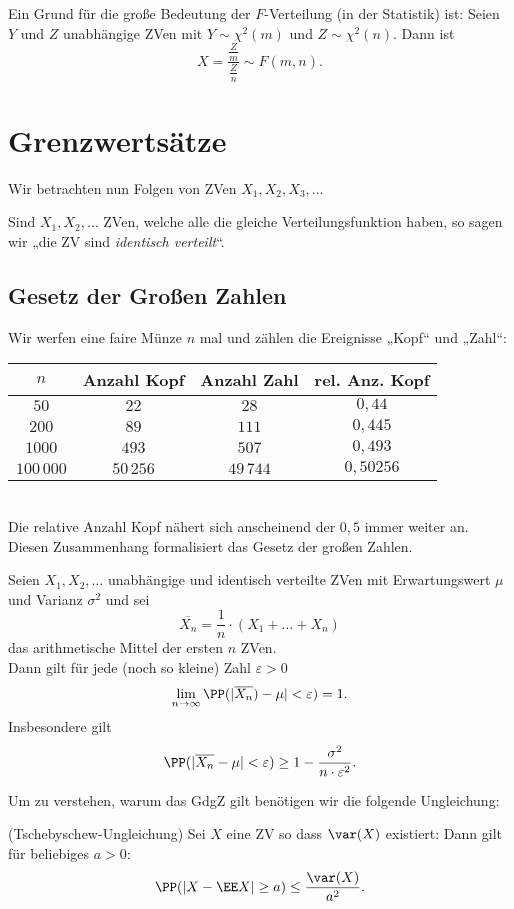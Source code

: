 Ein Grund für die große Bedeutung der $ F $-Verteilung (in der Statistik) ist:
 Seien $ Y $ und $ Z $ unabhängige ZVen mit $ Y\sim \chi^{2} (m) $ und $ Z \sim \chi^{2}(n) $. Dann ist 
\[ X=\frac{\frac{Z}{m}}{\frac{Z}{n}}\sim F(m,n) \text{.} \]
\section{Grenzwertsätze}

Wir betrachten nun Folgen von ZVen $X_1, X_2, X_3, \ldots$

 Sind $X_1, X_2, \ldots$ ZVen, welche alle die gleiche Verteilungsfunktion haben, so sagen wir „die ZV sind \emph{identisch verteilt}“.

\subsection{Gesetz der Großen Zahlen}
 Wir werfen eine faire Münze $n$ mal und zählen die Ereignisse „Kopf“ und „Zahl“:\\
\begin{tabular}{c | c | c | c}
	$n$ & Anzahl Kopf & Anzahl Zahl & rel. Anz. Kopf\\\hline
	$50$ & $22$ & $28$ & $0,44$\\
	$200$& $89$& $111$ & $0,445$\\
	$1000$ & $493$& $507$& $0,493$\\
	$100\,000$& $50\,256$&$49\,744$& $0,50256$
\end{tabular}\\
Die relative Anzahl Kopf nähert sich anscheinend der $0,5$ immer weiter an.\\
Diesen Zusammenhang formalisiert das Gesetz der großen Zahlen.

 Seien $X_1, X_2, \ldots$ unabhängige und identisch verteilte ZVen mit Erwartungswert $\mu$ und Varianz $\sigma^{2}$ und sei
\[ \overline{X_n}=\frac{1}{n}\cdot (X_1 + \ldots + X_n) \]
das arithmetische Mittel der ersten $n$ ZVen.\\
Dann gilt für jede (noch so kleine) Zahl $\varepsilon >0$
\[ \lim_{n\to \infty} \PP(|\overline{X_n}) -\mu| < \varepsilon) = 1 \text{.}\]
Insbesondere gilt
\[ \PP(|\overline{X_n}-\mu | < \varepsilon)\geq 1-\frac{\sigma^{2}}{n \cdot \varepsilon^{2}} \text{.} \]

Um zu verstehen, warum das GdgZ gilt benötigen wir die folgende Ungleichung:

 (Tschebyschew-Ungleichung) Sei $X$ eine ZV so dass $\var(X)$ existiert: Dann gilt für beliebiges $a>0$:
\[ \PP(|X-\EE X| \geq a) \leq \frac{\var(X)}{a^{2}} \text{.} \]

